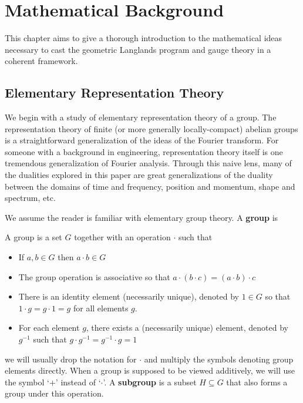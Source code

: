 \chapter{Mathematical Background\label{ch:math}}

	This chapter aims to give a thorough introduction to the mathematical ideas necessary to cast the geometric Langlands program and gauge theory in a coherent framework. 
	
	\section{Elementary Representation Theory} %
	\label{sec:elementary_representation_theory}
		We begin with a study of elementary representation theory of a group. The representation theory of finite (or more generally locally-compact) abelian groups is a straightforward generalization of the ideas of the Fourier transform. 
		For someone with a background in engineering, representation theory itself is one tremendous generalization of Fourier analysis. 
		Through this naive lens, many of the dualities explored in this paper are great generalizations of the duality between the domains of time and frequency, position and momentum, shape and spectrum, etc. 

		We assume the reader is familiar with elementary group theory. A \textbf{group} is 
		\begin{defn}[Group]
			A group is a set $G$ together with an operation $\cdot$ such that
			\begin{itemize}
				\item If $a, b \in G$ then $a\cdot b \in G$
				\item The group operation is associative so that $a \cdot (b \cdot c) = (a \cdot b) \cdot c$
				\item There is an identity element (necessarily unique), denoted by $1 \in G$ so that $1 \cdot g = g \cdot 1 = g$ for all elements $g$.
				\item For each element $g$, there exists a (necessarily unique) element, denoted by $g^{-1}$ such that $g \cdot g^{-1} = g^{-1} \cdot g = 1$ 
			\end{itemize}
		\end{defn}
		we will usually drop the notation for $\cdot$ and multiply the symbols denoting group elements directly. When a group is supposed to be viewed additively, we will use the symbol `$+$' instead of `$\cdot$'. A \textbf{subgroup} is a subset $H \subseteq G$ that also forms a group under this operation.
		
